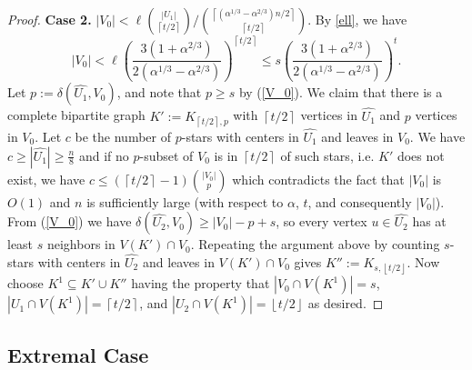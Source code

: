 \documentclass[oneside,12pt]{memoir}
\newcommand{\floor}[1]{\left\lfloor#1\right\rfloor}
\newcommand{\ceiling}[1]{\left\lceil#1\right\rceil}
\begin{document}
\begin{proof}
\noindent
\textbf{Case 2.} $|V_0|<  \ell \binom{|U_1|}{\ceiling{t/2}}/\binom{\ceiling{(\alpha^{1/3}-\alpha^{2/3})n/2}}{\ceiling{t/2}}$.  
By \eqref{ell}, we have
$$|V_0|< 
\ell\left(\frac{3(1+\alpha^{2/3})}{2(\alpha^{1/3}-\alpha^{2/3})}\right)^{\ceiling{t/2}}\leq s\left(\frac{3(1+\alpha^{2/3})}{2(\alpha^{1/3}-\alpha^{2/3})}\right)^{t}.$$  Let $p := \delta(\hat{U_1}, V_0)$, and note that $p\geq s$ by (\ref{V_0}).  We claim that there is a complete bipartite graph $K':= K_{\ceiling{t/2},p}$ with $\ceiling{t/2}$ vertices in $\hat{U_1}$ and $p$ vertices in $V_0$. Let $c$ be the number of $p$-stars with centers in $\hat{U_1}$ and leaves in $V_0$.  We have $c\geq |\hat{U_1}|\geq \frac{n}{8}$ and if no $p$-subset of $V_0$ is in $\ceiling{t/2}$ of such stars, i.e. $K'$ does not exist, we have $c\leq(\ceiling{t/2}-1)\binom{|V_0|}{p}$ which contradicts the fact that $|V_0|$ is $O(1)$ and $n$ is sufficiently large (with respect to $\alpha$, $t$, and consequently $|V_0|$). From (\ref{V_0}) we have $\delta(\hat{U_2},V_0)\geq|V_0|-p+s$, so every vertex $u \in  \hat{U_2}$ has at least $s$ neighbors in $V(K')\cap V_0$. Repeating the argument above by counting $s$-stars with centers in $\hat{U_2}$ and leaves in $V(K')\cap V_0$ gives $K'':=K_{s,\floor{t/2}}$.  Now choose $K^1\subseteq K'\cup K''$ having the property that $|V_0 \cap V(K^1)|=s$, $|U_1\cap V(K^1)|=\ceiling{t/2}$, and $|U_2\cap V(K^1)|=\floor{t/2}$ as desired.
\end{proof}

\subsection{Extremal Case}
\label{Extremal}
\end{document}
